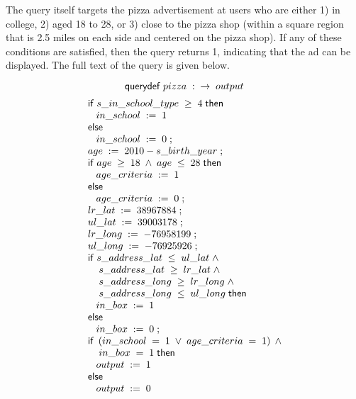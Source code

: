 The query itself targets the pizza advertisement
at users who are either 1) in college, 2) aged 18 to 28, or 3) close to the pizza
shop (within a square region that is 2.5 miles on each side and centered on the pizza
shop).  If any of these conditions are satisfied, then the query returns 1,
indicating that the ad can be displayed.  The full text of the query is given below.

$$ \mathsf{querydef} \; pizza \; : \; \; \rightarrow \; output$$
\begin{displaymath}{\small
\begin{array}{l}
  \sifk \; s\text{\_}in\text{\_}school\text{\_}type \; \geq \; 4 \; \sthenk\\
  \;\;\;\sassign{in\text{\_}school}{1}\\
  \selsek\\
  \;\;\;\sassign{in\text{\_}school}{0}\; ;\\
  \sassign{age}{\ebinop{-}{2010}{s\text{\_}birth\text{\_}year}}\; ;\\
  \sifk \; age \; \geq \; 18 \; \wedge \; age \; \leq \; 28 \; \sthenk\\
  \;\;\;\sassign{age\text{\_}criteria}{1}\\
  \selsek\\
  \;\;\;\sassign{age\text{\_}criteria}{0}\; ;\\
  \sassign{lr\text{\_}lat}{38967884}\; ;\\
  \sassign{ul\text{\_}lat}{39003178}\; ;\\
  \sassign{lr\text{\_}long}{-76958199}\; ;\\
  \sassign{ul\text{\_}long}{-76925926}\; ;\\
  \sifk \; s\text{\_}address\text{\_}lat \; \leq \;
  ul\text{\_}lat \; \wedge \\
  \;\;\;\; s\text{\_}address\text{\_}lat \; \geq \;
  lr\text{\_}lat \; \wedge \\
  \;\;\;\; s\text{\_}address\text{\_}long \; \geq \;
  lr\text{\_}long \; \wedge \\
  \;\;\;\; s\text{\_}address\text{\_}long \; \leq \; ul\text{\_}long \; \sthenk\\
  \;\;\;\sassign{in\text{\_}box}{1}\\
  \selsek\\
  \;\;\;\sassign{in\text{\_}box}{0}\; ;\\
  \sifk \; \paren{in\text{\_}school \; = \; 1 \; \vee \;
  age\text{\_}criteria \; = \; 1} \; \wedge \\
  \;\;\;\; in\text{\_}box \; = \; 1 \; \sthenk\\
  \;\;\;\sassign{output}{1}\\
  \selsek\\
  \;\;\;\sassign{output}{0}\\
\end{array}
}
\end{displaymath}

